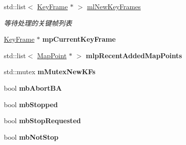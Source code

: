 \begin{DoxyCompactItemize}
\item 
\hypertarget{classORB__SLAM2_1_1LocalMapping_a4a365466d11db0f8e8fc14d76fc0cd83}{std\-::list$<$ \hyperlink{classORB__SLAM2_1_1KeyFrame}{Key\-Frame} $\ast$ $>$ \hyperlink{classORB__SLAM2_1_1LocalMapping_a4a365466d11db0f8e8fc14d76fc0cd83}{ml\-New\-Key\-Frames}}\label{classORB__SLAM2_1_1LocalMapping_a4a365466d11db0f8e8fc14d76fc0cd83}

\begin{DoxyCompactList}\small\item\em 等待处理的关键帧列表 \end{DoxyCompactList}\item 
\hypertarget{classORB__SLAM2_1_1LocalMapping_a1e4de53f96e97c6b94b794d0a5bc67e3}{\hyperlink{classORB__SLAM2_1_1KeyFrame}{Key\-Frame} $\ast$ {\bfseries mp\-Current\-Key\-Frame}}\label{classORB__SLAM2_1_1LocalMapping_a1e4de53f96e97c6b94b794d0a5bc67e3}

\item 
\hypertarget{classORB__SLAM2_1_1LocalMapping_afd75991c0499447411a3bd304cc9fa13}{std\-::list$<$ \hyperlink{classORB__SLAM2_1_1MapPoint}{Map\-Point} $\ast$ $>$ {\bfseries mlp\-Recent\-Added\-Map\-Points}}\label{classORB__SLAM2_1_1LocalMapping_afd75991c0499447411a3bd304cc9fa13}

\item 
\hypertarget{classORB__SLAM2_1_1LocalMapping_a970bb666e27d4e801453e9fc26e779a1}{std\-::mutex {\bfseries m\-Mutex\-New\-K\-Fs}}\label{classORB__SLAM2_1_1LocalMapping_a970bb666e27d4e801453e9fc26e779a1}

\item 
\hypertarget{classORB__SLAM2_1_1LocalMapping_a2d9c44abf1b175880ea418cfc404be87}{bool {\bfseries mb\-Abort\-B\-A}}\label{classORB__SLAM2_1_1LocalMapping_a2d9c44abf1b175880ea418cfc404be87}

\item 
\hypertarget{classORB__SLAM2_1_1LocalMapping_ada6ab808ccb95293baec4219ac59ca87}{bool {\bfseries mb\-Stopped}}\label{classORB__SLAM2_1_1LocalMapping_ada6ab808ccb95293baec4219ac59ca87}

\item 
\hypertarget{classORB__SLAM2_1_1LocalMapping_af38a9dca4bb96b7ae1711336596a609a}{bool {\bfseries mb\-Stop\-Requested}}\label{classORB__SLAM2_1_1LocalMapping_af38a9dca4bb96b7ae1711336596a609a}

\item 
\hypertarget{classORB__SLAM2_1_1LocalMapping_ad68f6c709f31a5dfca64b24967cc77f2}{bool {\bfseries mb\-Not\-Stop}}\label{classORB__SLAM2_1_1LocalMapping_ad68f6c709f31a5dfca64b24967cc77f2}


\end{DoxyCompactItemize}
